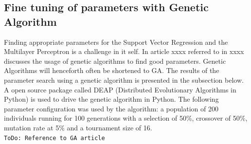 \subsection{Fine tuning of parameters with Genetic Algorithm} \label{sss:ga_tuning}
Finding appropriate parameters for the Support Vector Regression and the Multilayer Perceptron is a challenge in it self. In article xxxx referred to in xxxx discusses the usage of genetic algorithms to find good parameters. Genetic Algorithms will henceforth often be shortened to GA. The results of the parameter search using a genetic algorithm is presented in the subsection below. A open source package called DEAP (Distributed Evolutionary Algorithms in Python) is used to drive the genetic algorithm in Python. The following parameter configuration was used by the algorithm: a population of 200 individuals running for 100 generations with a selection of 50\%, crossover of 50\%, mutation rate at 5\% and a tournament size of 16. 
\\
\texttt{ToDo: Reference to GA article}

